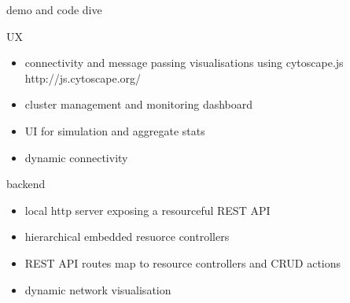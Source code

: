 \documentclass{beamer}
\begin{document}
\begin{section}{demo and code dive}

\begin{frame}{}
\begin{block}{UX}
 \begin{itemize}
\item  connectivity and message passing visualisations using cytoscape.js http://js.cytoscape.org/
\item  cluster management and monitoring dashboard
\item  UI for simulation and aggregate stats
\item dynamic connectivity
\end{itemize}
\end{block}

\begin{block}{backend}
 \begin{itemize}
\item  local http server exposing a resourceful REST API
\item  hierarchical embedded resuorce controllers
\item REST API routes map to resource controllers and CRUD actions
\item dynamic network visualisation
\end{itemize}
\end{block}
\end{frame}


\end{section}
\end{document}
